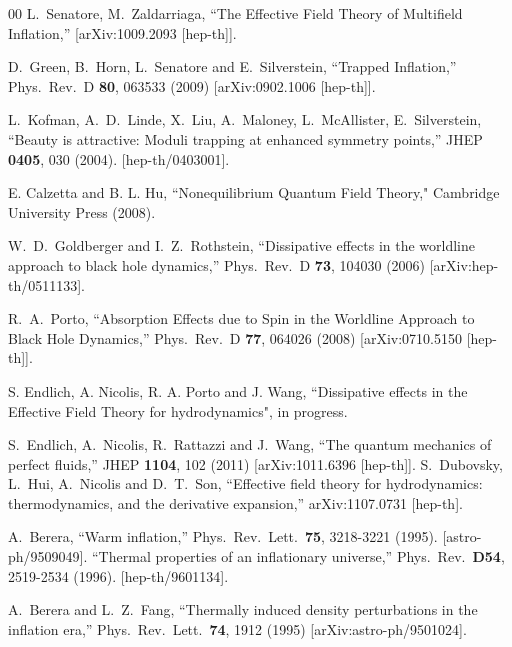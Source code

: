 \documentclass[11pt,amsmath,floats,floatfix,nofootinbib,secnumarabic, superscriptaddress, tightenlines]{revtex4}
\begin{document}
{\begin{thebibliography}{00}
  L.~Senatore, M.~Zaldarriaga,
  ``The Effective Field Theory of Multifield Inflation,''
    [arXiv:1009.2093 [hep-th]].

  D.~Green, B.~Horn, L.~Senatore and E.~Silverstein, ``Trapped Inflation,''
  Phys.\ Rev.\  D {\bf 80}, 063533 (2009)
  [arXiv:0902.1006 [hep-th]].
  
    L.~Kofman, A.~D.~Linde, X.~Liu, A.~Maloney, L.~McAllister, E.~Silverstein,
  ``Beauty is attractive: Moduli trapping at enhanced symmetry points,''
  JHEP {\bf 0405}, 030 (2004).
  [hep-th/0403001].

 E. Calzetta and B. L. Hu, ``Nonequilibrium Quantum Field Theory," Cambridge University Press (2008).

 W.~D.~Goldberger and I.~Z.~Rothstein,
  ``Dissipative effects in the worldline approach to black hole dynamics,''
  Phys.\ Rev.\  D {\bf 73}, 104030 (2006)
  [arXiv:hep-th/0511133].

 R.~A.~Porto,
  ``Absorption Effects due to Spin in the Worldline Approach to Black Hole
  Dynamics,''
  Phys.\ Rev.\  D {\bf 77}, 064026 (2008)
  [arXiv:0710.5150 [hep-th]].
  
 S. Endlich, A. Nicolis, R. A. Porto and J. Wang, ``Dissipative effects in the Effective Field Theory for hydrodynamics", in progress. 

 S.~Endlich, A.~Nicolis, R.~Rattazzi and J.~Wang, ``The quantum mechanics of perfect fluids,''
  JHEP {\bf 1104}, 102 (2011) [arXiv:1011.6396 [hep-th]].  S.~Dubovsky, L.~Hui, A.~Nicolis and D.~T.~Son,
  ``Effective field theory for hydrodynamics: thermodynamics, and the derivative expansion,''
  arXiv:1107.0731 [hep-th].

  A.~Berera, ``Warm inflation,''
  Phys.\ Rev.\ Lett.\  {\bf 75}, 3218-3221 (1995).
  [astro-ph/9509049]. ``Thermal properties of an inflationary universe,''
  Phys.\ Rev.\  {\bf D54}, 2519-2534 (1996).
  [hep-th/9601134].

 A.~Berera and L.~Z.~Fang,
  ``Thermally induced density perturbations in the inflation era,''
  Phys.\ Rev.\ Lett.\  {\bf 74}, 1912 (1995)
  [arXiv:astro-ph/9501024].
 

\end{thebibliography}}
\end{document}

